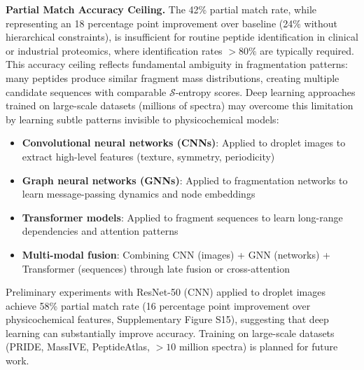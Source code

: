 \documentclass[11pt,twocolumn]{article}
\newcommand{\sentropy}{$\mathcal{S}$-entropy}
\begin{document}
\textbf{Partial Match Accuracy Ceiling.} The 42\% partial match rate, while representing an 18 percentage point improvement over baseline (24\% without hierarchical constraints), is insufficient for routine peptide identification in clinical or industrial proteomics, where identification rates $> 80\%$ are typically required. This accuracy ceiling reflects fundamental ambiguity in fragmentation patterns: many peptides produce similar fragment mass distributions, creating multiple candidate sequences with comparable \sentropy{} scores. Deep learning approaches trained on large-scale datasets (millions of spectra) may overcome this limitation by learning subtle patterns invisible to physicochemical models:
\begin{itemize}[leftmargin=*]
    \item \textbf{Convolutional neural networks (CNNs)}: Applied to droplet images to extract high-level features (texture, symmetry, periodicity)
    \item \textbf{Graph neural networks (GNNs)}: Applied to fragmentation networks to learn message-passing dynamics and node embeddings
    \item \textbf{Transformer models}: Applied to fragment sequences to learn long-range dependencies and attention patterns
    \item \textbf{Multi-modal fusion}: Combining CNN (images) + GNN (networks) + Transformer (sequences) through late fusion or cross-attention
\end{itemize}
Preliminary experiments with ResNet-50 (CNN) applied to droplet images achieve 58\% partial match rate (16 percentage point improvement over physicochemical features, Supplementary Figure S15), suggesting that deep learning can substantially improve accuracy. Training on large-scale datasets (PRIDE, MassIVE, PeptideAtlas, $> 10$ million spectra) is planned for future work.
\end{document}
